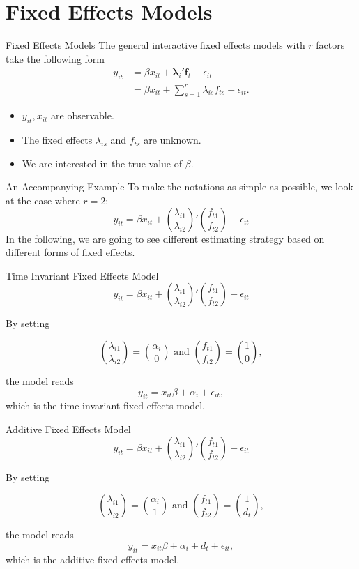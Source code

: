\documentclass{beamer}
\begin{document}
\section{Fixed Effects Models}
\begin{frame}{Fixed Effects Models}
    The general interactive fixed effects models with $r$ factors take the following form
    \begin{align*}
        y_{it}&= \beta x_{it}+\boldsymbol \lambda_i'\boldsymbol f_t+\epsilon_{it}\\
        &=\beta x_{it}+ \sum_{s=1}^r \lambda_{is} f_{ts}+\epsilon_{it}.
    \end{align*}

    \begin{itemize}
        \item $y_{it}, x_{it}$ are observable.
        \item The fixed effects $\lambda_{is}$ and $f_{ts}$ are unknown.
        \item We are interested in the true value of $\beta$.
    \end{itemize}


\end{frame}

\begin{frame}{An Accompanying Example}
    To make the notations as simple as possible, we look at the case where $r=2$:
    \[
    y_{it}= \beta x_{it}+\binom{\lambda_{i1}}{\lambda_{i2}}' \binom{f_{t1}}{f_{t2}}+\epsilon_{it}
    \]
    In the following, we are going to see different estimating strategy based on different forms of fixed effects.
\end{frame}




\begin{frame}{Time Invariant Fixed Effects Model}
{\color{gray}\footnotesize \[
       y_{it}= \beta x_{it}+\binom{\lambda_{i1}}{\lambda_{i2}}' \binom{f_{t1}}{f_{t2}}+\epsilon_{it}
    \]}

    By setting



    \[
    \binom{\lambda_{i1}}{\lambda_{i2}}=\binom{\alpha_i}{0} \text{ and } \binom{f_{t1}}{f_{t2}}=\binom{1}{0},
    \]

    the model reads
    \[
    y_{it}=x_{it}\beta+\alpha_i+\epsilon_{it},
    \]
    which is the time invariant fixed effects model.
\end{frame}

\begin{frame}{Additive Fixed Effects Model}
    {\color{gray}\footnotesize \[
       y_{it}= \beta x_{it}+\binom{\lambda_{i1}}{\lambda_{i2}}' \binom{f_{t1}}{f_{t2}}+\epsilon_{it}
    \]}

    By setting



    \[
    \binom{\lambda_{i1}}{\lambda_{i2}}=\binom{\alpha_i}{1} \text{ and } \binom{f_{t1}}{f_{t2}}=\binom{1}{d_t},
    \]

    the model reads
    \[
    y_{it}=x_{it}\beta+\alpha_i+d_t+\epsilon_{it},
    \]
    which is the additive fixed effects model.
\end{frame}
\end{document}
